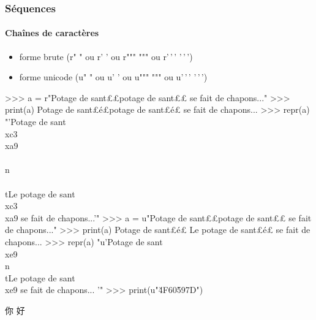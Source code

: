 \begin{frame}[fragile]
\frametitle{Séquences}
\framesubtitle{Chaînes de caractères}
\begin{itemize}
 \item forme brute (r" " ou r' ' ou r""" """ ou r'\,'\,' '\,'\,')
 \item forme unicode (u" " ou u' ' ou u""" """ ou u'\,'\,' '\,'\,')
\end{itemize}
\begin{pythonConsole}
>>> a = r"Potage de sant£\color{magenta}{é}£\n\tLe potage de sant£\color{magenta}{é}£ se fait de chapons..."
>>> print(a)
Potage de sant£é£\n\tLe potage de sant£é£ se fait de chapons...
>>> repr(a)
"'Potage de sant\\xc3\\xa9\\\\n\\\\tLe potage de sant\\xc3\\xa9 se fait 
de chapons...'"
>>> a = u"Potage de sant£\color{magenta}{é}£\n\tLe potage de sant£\color{magenta}{é}£ se fait de chapons..."
>>> print(a)
Potage de sant£é£
    Le potage de sant£é£ se fait de chapons...
>>> repr(a)
"u'Potage de sant\\xe9\\n\\tLe potage de sant\\xe9 se fait de chapons...
'"
>>> print(u"\u4F60\u597D")
\end{pythonConsole}
\begin{CJK*}{UTF8}{gbsn}
你 好
\end{CJK*}
\end{frame}

